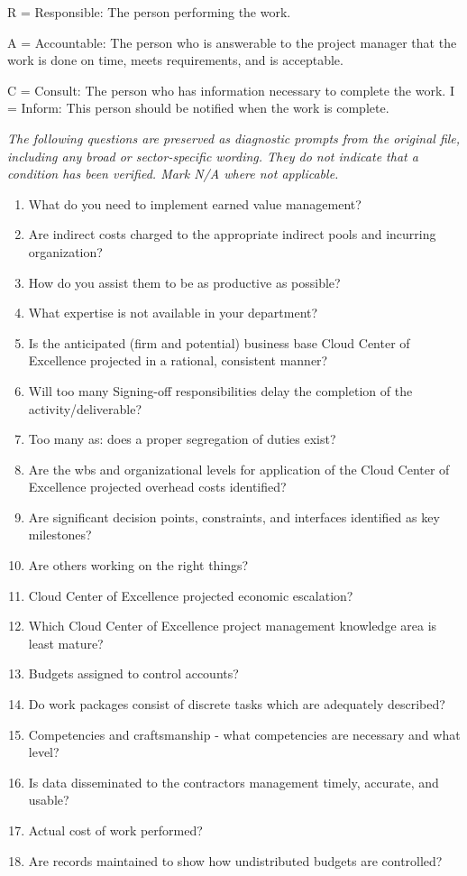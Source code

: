 \documentclass[10pt,letterpaper]{article}
\newcommand{\docsection}[1]{\par\Needspace{5\baselineskip}\vspace{8pt}{\large\sffamily\bfseries\color{navy}#1}\par\vspace{2pt}{\color{rulegrey}\rule{\linewidth}{.6pt}}\par}
\begin{document}
\noindent\footnotesize R = Responsible: The person performing the work.\par
\noindent\footnotesize A = Accountable: The person who is answerable to the project manager that the work is done on time, meets requirements, and is acceptable.\par
\noindent\footnotesize C = Consult: The person who has information necessary to complete the work. I = Inform: This person should be notified when the work is complete.\par
\docsection{03 \quad Source diagnostic checklist}
\textit{The following questions are preserved as diagnostic prompts from the original file, including any broad or sector-specific wording. They do not indicate that a condition has been verified. Mark N/A where not applicable.}
\begingroup\small\begin{enumerate}[leftmargin=2.1em, itemsep=4pt]
\item[1.] What do you need to implement earned value management?
\item[2.] Are indirect costs charged to the appropriate indirect pools and incurring organization?
\item[3.] How do you assist them to be as productive as possible?
\item[4.] What expertise is not available in your department?
\item[5.] Is the anticipated (firm and potential) business base Cloud Center of Excellence projected in a rational, consistent manner?
\item[6.] Will too many Signing-off responsibilities delay the completion of the activity/deliverable?
\item[7.] Too many as: does a proper segregation of duties exist?
\item[8.] Are the wbs and organizational levels for application of the Cloud Center of Excellence projected overhead costs identified?
\item[9.] Are significant decision points, constraints, and interfaces identified as key milestones?
\item[10.] Are others working on the right things?
\item[11.] Cloud Center of Excellence projected economic escalation?
\item[12.] Which Cloud Center of Excellence project management knowledge area is least mature?
\item[13.] Budgets assigned to control accounts?
\item[14.] Do work packages consist of discrete tasks which are adequately described?
\item[15.] Competencies and craftsmanship - what competencies are necessary and what level?
\item[16.] Is data disseminated to the contractors management timely, accurate, and usable?
\item[17.] Actual cost of work performed?
\item[18.] Are records maintained to show how undistributed budgets are controlled?
\end{enumerate}\endgroup
\end{document}
